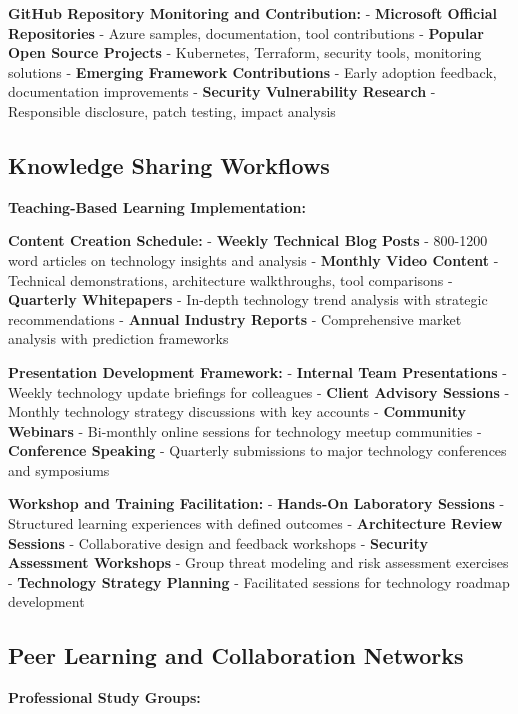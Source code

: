 \documentclass[
  letterpaper,
  DIV=11,
  numbers=noendperiod]{scrartcl}
\begin{document}
\textbf{GitHub Repository Monitoring and Contribution:} -
\textbf{Microsoft Official Repositories} - Azure samples, documentation,
tool contributions - \textbf{Popular Open Source Projects} - Kubernetes,
Terraform, security tools, monitoring solutions - \textbf{Emerging
Framework Contributions} - Early adoption feedback, documentation
improvements - \textbf{Security Vulnerability Research} - Responsible
disclosure, patch testing, impact analysis

\subsection{Knowledge Sharing
Workflows}\label{knowledge-sharing-workflows}

\textbf{Teaching-Based Learning Implementation:}

\textbf{Content Creation Schedule:} - \textbf{Weekly Technical Blog
Posts} - 800-1200 word articles on technology insights and analysis -
\textbf{Monthly Video Content} - Technical demonstrations, architecture
walkthroughs, tool comparisons - \textbf{Quarterly Whitepapers} -
In-depth technology trend analysis with strategic recommendations -
\textbf{Annual Industry Reports} - Comprehensive market analysis with
prediction frameworks

\textbf{Presentation Development Framework:} - \textbf{Internal Team
Presentations} - Weekly technology update briefings for colleagues -
\textbf{Client Advisory Sessions} - Monthly technology strategy
discussions with key accounts - \textbf{Community Webinars} - Bi-monthly
online sessions for technology meetup communities - \textbf{Conference
Speaking} - Quarterly submissions to major technology conferences and
symposiums

\textbf{Workshop and Training Facilitation:} - \textbf{Hands-On
Laboratory Sessions} - Structured learning experiences with defined
outcomes - \textbf{Architecture Review Sessions} - Collaborative design
and feedback workshops - \textbf{Security Assessment Workshops} - Group
threat modeling and risk assessment exercises - \textbf{Technology
Strategy Planning} - Facilitated sessions for technology roadmap
development

\subsection{Peer Learning and Collaboration
Networks}\label{peer-learning-and-collaboration-networks}

\textbf{Professional Study Groups:}
\end{document}
